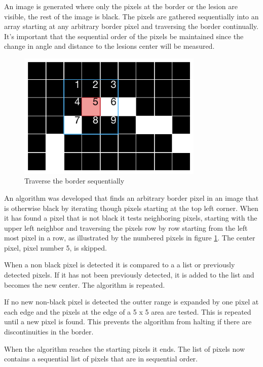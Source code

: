 An image is generated where only the pixels at the border or the lesion are visible, the rest of the image is black. The pixels are gathered sequentially into an array starting at any arbitrary border pixel and traversing the border continually. It's important that the sequential order of the pixels be maintained since the change in angle and distance to the lesions center will be measured.

\begin{figure}[H]
    \centering
    \includegraphics[height=6cm,keepaspectratio]{assets/border/travers_grid.pdf}
    \caption{Traverse the border sequentially}
    \label{fig:tra_border}
\end{figure}

An algorithm was developed that finds an arbitrary border pixel in an image that is otherwise black by iterating though pixels starting at the top left corner. When it has found a pixel that is not black it tests neighboring pixels, starting with the upper left neighbor and traversing the pixels row by row starting from the left most pixel in a row, as illustrated by the numbered pixels in figure \ref{fig:tra_border}. The center pixel, pixel number 5, is skipped.

When a non black pixel is detected it is compared to a a list or previously detected pixels. If it has not been previously detected, it is added to the list and becomes the new center. The algorithm is repeated.

If no new non-black pixel is detected the outter range is expanded by one pixel at each edge and the pixels at the edge of a 5 x 5 area are tested. This is repeated until a new pixel is found. This prevents the algorithm from halting if there are discontinuities in the border.

When the algorithm reaches the starting pixels it ends. The list of pixels now contains a sequential list of pixels that are in sequential order.

